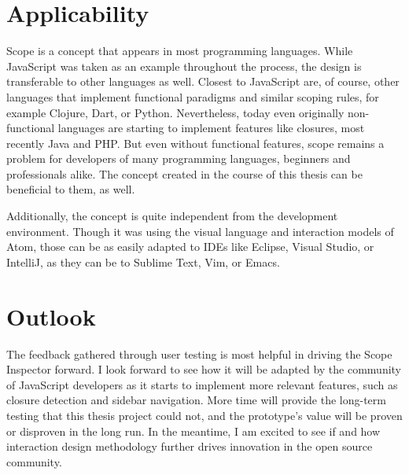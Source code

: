 \section{Applicability}\label{applicability}

Scope is a concept that appears in most programming languages. While
JavaScript was taken as an example throughout the process, the design is
transferable to other languages as well. Closest to JavaScript are, of
course, other languages that implement functional paradigms and similar
scoping rules, for example Clojure, Dart, or Python. Nevertheless, today
even originally non-functional languages are starting to implement
features like closures, most recently Java and PHP. But even without
functional features, scope remains a problem for developers of many
programming languages, beginners and professionals alike. The concept
created in the course of this thesis can be beneficial to them, as well.

Additionally, the concept is quite independent from the development
environment. Though it was using the visual language and interaction
models of Atom, those can be as easily adapted to IDEs like Eclipse,
Visual Studio, or IntelliJ, as they can be to Sublime Text, Vim, or
Emacs.

\section{Outlook}\label{outlook}

The feedback gathered through user testing is most helpful in driving
the Scope Inspector forward. I look forward to see how it will be
adapted by the community of JavaScript developers as it starts to
implement more relevant features, such as closure detection and sidebar
navigation. More time will provide the long-term testing that this
thesis project could not, and the prototype’s value will be proven or
disproven in the long run. In the meantime, I am excited to see if and
how interaction design methodology further drives innovation in the open
source community.
